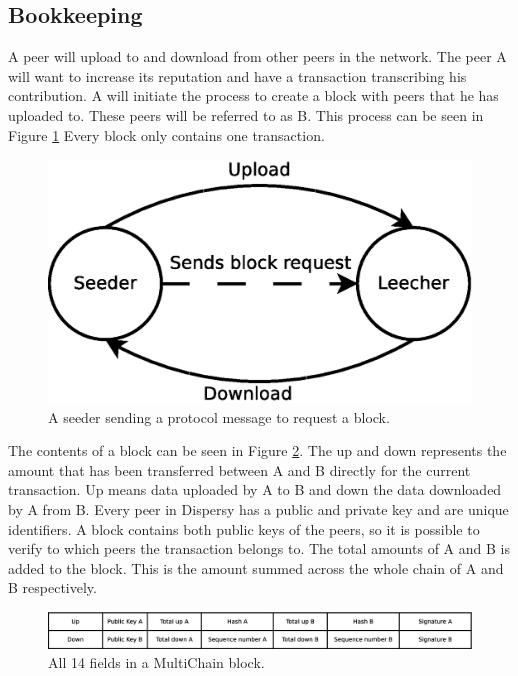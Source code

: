 \subsection{Bookkeeping}
A peer will upload to and download from other peers in the network.
The peer A will want to increase its reputation and have a transaction transcribing his contribution.
A will initiate the process to create a block with peers that he has uploaded to.
These peers will be referred to as B.
This process can be seen in Figure \ref{fig:seeder-downloader}
Every block only contains one transaction.

\begin{figure}
	\centerline{\includegraphics[scale=0.3]{design/figs/seeder-downloader.eps}}
	\caption{A seeder sending a protocol message to request a block.}
	\label{fig:seeder-downloader}
\end{figure}

The contents of a block can be seen in Figure \ref{fig:block}.
The up and down represents the amount that has been transferred between A and B directly for the current transaction.
Up means data uploaded by A to B and down the data downloaded by A from B.
Every peer in Dispersy has a public and private key and are unique identifiers.
A block contains both public keys of the peers,
so it is possible to verify to which peers the transaction belongs to.
The total amounts of A and B is added to the block.
This is the amount summed across the whole chain of A and B respectively.

\begin{figure}
	\centerline{\includegraphics[scale=0.3]{design/figs/block.eps}}
	\caption{All 14 fields in a MultiChain block.}
	\label{fig:block}
\end{figure}

